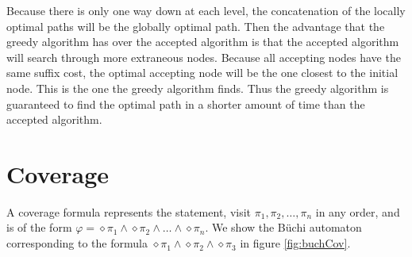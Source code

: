 Because there is only one way down at each level, the concatenation of the locally optimal paths will be the globally optimal path. Then the advantage that the greedy algorithm has over the accepted algorithm is that the accepted algorithm will search through more extraneous nodes. Because all accepting nodes have the same suffix cost, the optimal accepting node will be the one closest to the initial node. This is the one the greedy algorithm finds. Thus the greedy algorithm is guaranteed to find the optimal path in a shorter amount of time than the accepted algorithm.


\section{Coverage}
A coverage formula represents the statement, visit $\pi_1, \pi_2, \dots, \pi_n$ in any order, and is of the form $\varphi = \diamond \pi_1 \wedge \diamond \pi_2 \wedge \dots \wedge \diamond \pi_n$. We show the B\"uchi automaton corresponding to the formula $\diamond \pi_1 \wedge \diamond \pi_2 \wedge \diamond \pi_3$ in figure \ref{fig:buchCov}.

